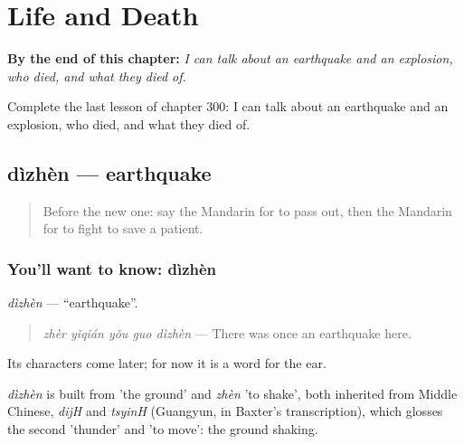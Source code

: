
\chapter{Life and Death}
\label{ch:zh-life-and-death}

\begin{chapteropening}
\textbf{By the end of this chapter:} \emph{I can talk about an earthquake and an explosion, who died, and what they died of.}

Complete the last lesson of chapter 300: I can talk about an earthquake and an explosion, who died, and what they died of.
\end{chapteropening}

\section[dìzhèn]{dìzhèn — earthquake}

\label{lesson:ZH-C300-dizhen}



\begin{quote}
Before the new one: say the Mandarin for to pass out, then the Mandarin for to fight to save a patient.
\end{quote}

\subsection*{You'll want to know: dìzhèn}
\emph{dìzhèn} — \textquotedblleft{}earthquake\textquotedblright{}.

\begin{quote}
\emph{zhèr yǐqián yǒu guo dìzhèn} — There was once an earthquake here.
\end{quote}

Its characters come later; for now it is a word for the ear.

\begin{cousinweb}
\emph{dìzhèn} is built from  'the ground' and \emph{zhèn} 'to shake', both inherited from Middle Chinese, \emph{dijH} and \emph{tsyinH} (Guangyun, in Baxter's transcription), which glosses the second 'thunder' and 'to move': the ground shaking.
\end{cousinweb}

